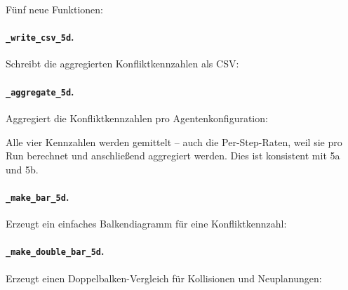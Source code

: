 

Fünf neue Funktionen:

\paragraph{\texttt{\_write\_csv\_5d}.}
Schreibt die aggregierten Konfliktkennzahlen als CSV:



\paragraph{\texttt{\_aggregate\_5d}.}
Aggregiert die Konfliktkennzahlen pro Agentenkonfiguration:



Alle vier Kennzahlen werden gemittelt -- auch die Per-Step-Raten, weil sie pro Run berechnet und anschließend aggregiert werden. Dies ist konsistent mit 5a und 5b.

\paragraph{\texttt{\_make\_bar\_5d}.}
Erzeugt ein einfaches Balkendiagramm für eine Konfliktkennzahl:



\paragraph{\texttt{\_make\_double\_bar\_5d}.}
Erzeugt einen Doppelbalken-Vergleich für Kollisionen und Neuplanungen:




